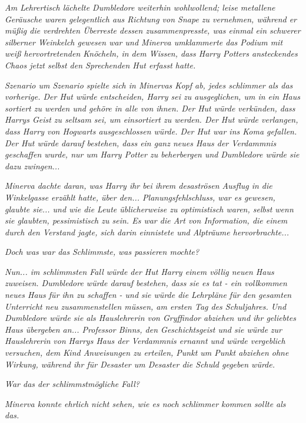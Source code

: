 {\hfill\break \emph{Am Lehrertisch lächelte Dumbledore weiterhin wohlwollend; leise metallene Geräusche waren gelegentlich aus Richtung von Snape zu vernehmen, während er müßig die verdrehten Überreste dessen zusammenpresste, was einmal ein schwerer silberner Weinkelch gewesen war und Minerva umklammerte das Podium mit weiß hervortretenden Knöcheln, in dem Wissen, dass Harry Potters ansteckendes Chaos jetzt selbst den Sprechenden Hut erfasst hatte.}

\emph{Szenario um Szenario spielte sich in Minervas Kopf ab, jedes schlimmer als das vorherige. Der Hut würde entscheiden, Harry sei zu ausgeglichen, um in ein Haus sortiert zu werden und gehöre in alle von ihnen. Der Hut würde verkünden, dass Harrys Geist zu seltsam sei, um einsortiert zu werden. Der Hut würde verlangen, dass Harry von Hogwarts ausgeschlossen würde. Der Hut war ins Koma gefallen. Der Hut würde darauf bestehen, dass ein ganz neues Haus der Verdammnis geschaffen wurde, nur um Harry Potter zu beherbergen und} \emph{\emph{Dumbledore würde sie dazu zwingen...}}

\emph{Minerva dachte daran, was Harry ihr bei ihrem desaströsen Ausflug in die Winkelgasse erzählt hatte, über den... Planungsfehlschluss, war es gewesen, glaubte sie... und wie die Leute üblicherweise zu optimistisch waren, selbst wenn sie glaubten, pessimistisch zu sein. Es war die Art von Information, die einem durch den Verstand jagte, sich darin einnistete und Alpträume hervorbrachte...}

\emph{Doch was war das} \emph{\emph{Schlimmste,}} \emph{was passieren mochte?}

\emph{Nun... im schlimmsten Fall würde der Hut Harry einem völlig neuen Haus zuweisen. Dumbledore würde darauf bestehen, dass sie es tat - ein vollkommen neues Haus für ihn zu schaffen - und sie würde die Lehrpläne für den gesamten Unterricht neu zusammenstellen müssen, am ersten Tag des Schuljahres. Und Dumbledore würde sie als Hauslehrerin von Gryffindor abziehen und ihr geliebtes Haus übergeben an... Professor Binns, den Geschichtsgeist und sie würde} \emph{zur} \emph{Hauslehrerin} \emph{von} \emph{Harrys Haus der Verdammnis ernannt und würde vergeblich versuchen, dem Kind Anweisungen zu erteilen, Punkt um Punkt abziehen ohne Wirkung, während ihr für Desaster um Desaster die Schuld gegeben würde.}

\emph{War das der schlimmstmögliche Fall?}

\emph{Minerva konnte ehrlich nicht sehen, wie es noch schlimmer kommen sollte als das.}

}
